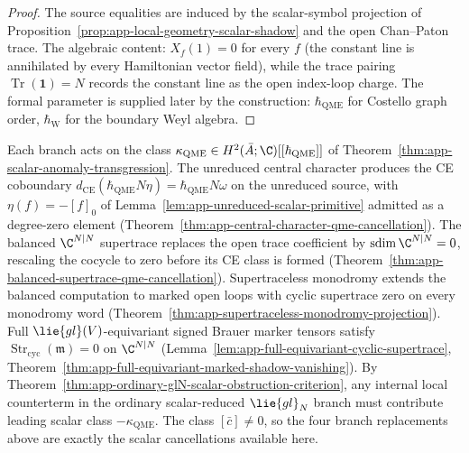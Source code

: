 \begin{proof}
  The source equalities are induced by the scalar-symbol projection
  of Proposition~\ref{prop:app-local-geometry-scalar-shadow}
  and the open Chan--Paton trace.  The algebraic content:
  \(X_f(1)=0\) for
  every \(f\) (the constant line is annihilated by every Hamiltonian
  vector field), while the trace pairing
  \(\operatorname{Tr}(\mathbf 1)=N\) records the constant line as the
  open index-loop charge.  The formal parameter is supplied later by
  the construction: \(\hbar_{\mathrm{QME}}\) for Costello graph order,
  \(\hbar_{\mathrm{W}}\) for the boundary Weyl algebra.
\end{proof}

\begin{rmk}
\label{rmk:app-scalar-anomaly-transgression-branches}
  Each branch acts on the class
  \(\kappa_{\mathrm{QME}}\in
  H^2(\bar A;\C)[[\hbar_{\mathrm{QME}}]]\) of
  Theorem~\ref{thm:app-scalar-anomaly-transgression}.  The unreduced
  central character produces the CE coboundary
  \(d_{\mathrm{CE}}(\hbar_{\mathrm{QME}}N\eta)
    =\hbar_{\mathrm{QME}}N\omega\) on the unreduced
  source, with \(\eta(f)=-[f]_0\) of
  Lemma~\ref{lem:app-unreduced-scalar-primitive} admitted as a
  degree-zero element
  (Theorem~\ref{thm:app-central-character-qme-cancellation}).  The
  balanced \(\C^{N|N}\) supertrace replaces the open trace coefficient
  by \(\operatorname{sdim}\C^{N|N}=0\), rescaling the cocycle to zero
  before its CE class is formed
  (Theorem~\ref{thm:app-balanced-supertrace-qme-cancellation}).
  Supertraceless monodromy extends the balanced computation to marked
  open loops with cyclic supertrace zero on every monodromy word
  (Theorem~\ref{thm:app-supertraceless-monodromy-projection}).  Full
  \(\lie{gl}(V)\)-equivariant signed Brauer marker tensors satisfy
  \(\operatorname{Str}_{\mathrm{cyc}}(\mathfrak m)=0\) on
  \(\C^{N|N}\)
  (Lemma~\ref{lem:app-full-equivariant-cyclic-supertrace},
  Theorem~\ref{thm:app-full-equivariant-marked-shadow-vanishing}).
  By Theorem~\ref{thm:app-ordinary-glN-scalar-obstruction-criterion},
  any internal local counterterm in the ordinary scalar-reduced
  \(\lie{gl}_N\) branch must contribute leading scalar class
  \(-\kappa_{\mathrm{QME}}\).  The class \([\bar c]\neq0\), so the four branch
  replacements above are exactly the scalar cancellations available here.
\end{rmk}

